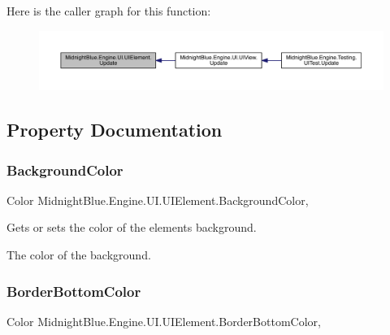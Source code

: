 Here is the caller graph for this function\+:
\nopagebreak
\begin{figure}[H]
\begin{center}
\leavevmode
\includegraphics[width=350pt]{class_midnight_blue_1_1_engine_1_1_u_i_1_1_u_i_element_a5b2bff6eed644fc33bc3e1ffaa8bfc70_icgraph}
\end{center}
\end{figure}


\subsection{Property Documentation}
\hypertarget{class_midnight_blue_1_1_engine_1_1_u_i_1_1_u_i_element_ae6b8bade95c87535e03228f2d0277b21}{}\label{class_midnight_blue_1_1_engine_1_1_u_i_1_1_u_i_element_ae6b8bade95c87535e03228f2d0277b21} 
\subsubsection{\texorpdfstring{Background\+Color}{BackgroundColor}}
{\footnotesize\ttfamily Color Midnight\+Blue.\+Engine.\+U\+I.\+U\+I\+Element.\+Background\+Color\hspace{0.3cm}{\ttfamily [get]}, {\ttfamily [set]}}



Gets or sets the color of the elements background. 

The color of the background.\hypertarget{class_midnight_blue_1_1_engine_1_1_u_i_1_1_u_i_element_a0714670ed29238fcbb24b9d4beaae2e3}{}\label{class_midnight_blue_1_1_engine_1_1_u_i_1_1_u_i_element_a0714670ed29238fcbb24b9d4beaae2e3} 
\subsubsection{\texorpdfstring{Border\+Bottom\+Color}{BorderBottomColor}}
{\footnotesize\ttfamily Color Midnight\+Blue.\+Engine.\+U\+I.\+U\+I\+Element.\+Border\+Bottom\+Color\hspace{0.3cm}{\ttfamily [get]}, {\ttfamily [set]}}



